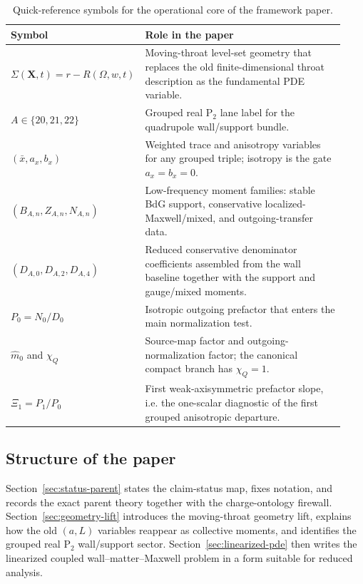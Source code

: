 \documentclass[11pt]{article}
\theoremstyle{definition}
\newcommand{\Ptwo}{\ensuremath{\mathrm{P}_2}}
\newcommand{\mhat}{\ensuremath{\hat m_0}}
\newcommand{\XiOne}{\ensuremath{\Xi_1}}
\begin{document}
\begin{table}[ht]
\centering
\begin{tabular}{@{}L{0.24\linewidth}L{0.69\linewidth}@{}}
\toprule
Symbol & Role in the paper \\
\midrule
\(\Sigma(\mathbf X,t)=r-R(\Omega,w,t)\) & Moving-throat level-set geometry that replaces the old finite-dimensional throat description as the fundamental PDE variable. \\
\(A\in\{20,21,22\}\) & Grouped real \(\Ptwo\) lane label for the quadrupole wall/support bundle. \\
\((\bar x,a_x,b_x)\) & Weighted trace and anisotropy variables for any grouped triple; isotropy is the gate \(a_x=b_x=0\). \\
\((B_{A,n},Z_{A,n},N_{A,n})\) & Low-frequency moment families: stable BdG support, conservative localized-Maxwell/mixed, and outgoing-transfer data. \\
\((D_{A,0},D_{A,2},D_{A,4})\) & Reduced conservative denominator coefficients assembled from the wall baseline together with the support and gauge/mixed moments. \\
\(P_0=N_0/D_0\) & Isotropic outgoing prefactor that enters the main normalization test. \\
\(\mhat\) and \(\chi_Q\) & Source-map factor and outgoing-normalization factor; the canonical compact branch has \(\chi_Q=1\). \\
\(\XiOne=P_1/P_0\) & First weak-axisymmetric prefactor slope, i.e. the one-scalar diagnostic of the first grouped anisotropic departure. \\
\bottomrule
\end{tabular}
\caption{Quick-reference symbols for the operational core of the framework paper.}
\label{tab:key-symbols}
\end{table}

\subsection{Structure of the paper}

Section~\ref{sec:status-parent} states the claim-status map, fixes notation, and records the exact parent theory together with the charge-ontology firewall. Section~\ref{sec:geometry-lift} introduces the moving-throat geometry lift, explains how the old $(a,L)$ variables reappear as collective moments, and identifies the grouped real $\Ptwo$ wall/support sector. Section~\ref{sec:linearized-pde} then writes the linearized coupled wall--matter--Maxwell problem in a form suitable for reduced analysis.
\end{document}
